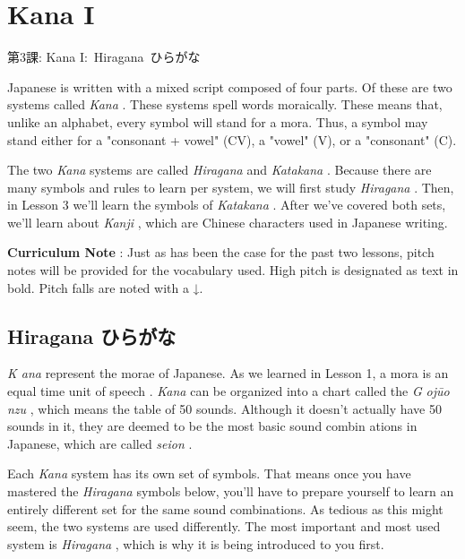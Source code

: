     
\chapter{Kana I}

\begin{center}
\begin{Large}
第3課: Kana I: Hiragana ひらがな  
\end{Large}
\end{center}
 
\par{ Japanese is written with a mixed script composed of four parts. Of these are two systems called \emph{Kana }. These systems spell words moraically. These means that, unlike an alphabet, every symbol will stand for a mora. Thus, a symbol may stand either for a "consonant + vowel" (CV), a "vowel" (V), or a "consonant" (C). }

\par{ The two \emph{Kana }systems are called \emph{Hiragana }and \emph{Katakana }. Because there are many symbols and rules to learn per system, we will first study \emph{Hiragana }. Then, in Lesson 3 we'll learn the symbols of \emph{Katakana }. After we've covered both sets, we'll learn about \emph{Kanji }, which are Chinese characters used in Japanese writing. }

\par{\textbf{Curriculum Note }: Just as has been the case for the past two lessons, pitch notes will be provided for the vocabulary used. High pitch is designated as text in bold. Pitch falls are noted with a ↓. }
      
\section{Hiragana ひらがな}
 
\par{\emph{K ana }represent the morae of Japanese. As we learned in Lesson 1, a mora is an equal time unit of speech . \emph{Kana }can be organized into a chart called the \emph{G }\emph{ojūo }\emph{nzu }, which means the table of 50 sounds. Although it doesn't actually have 50 sounds in it, they are deemed to be the most basic sound combin ations in Japanese, which are called \emph{seion }. }

\par{ Each \emph{Kana }system has its own set of symbols. That means once you have mastered the \emph{Hiragana }symbols below, you'll have to prepare yourself to learn an entirely different set for the same sound combinations. As tedious as this might seem, the two systems are used differently. The most important and most used system is \emph{Hiragana }, which is why it is being introduced to you first. }

